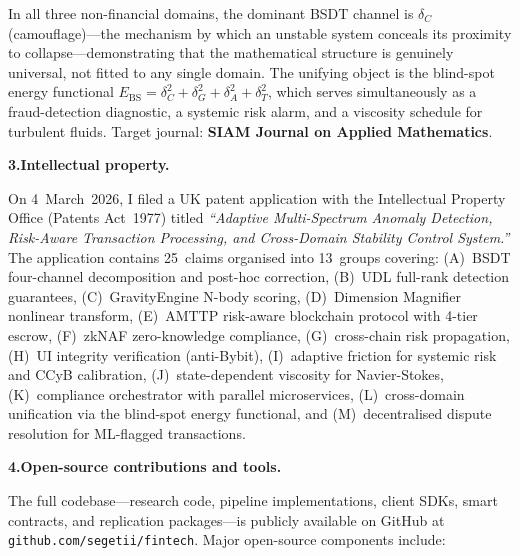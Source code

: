 \documentclass[12pt,a4paper]{article}
\begin{document}
\noindent
In all three non-financial domains, the dominant BSDT channel is
$\delta_C$ (camouflage)---the mechanism by which an unstable system
conceals its proximity to collapse---demonstrating that the mathematical
structure is genuinely universal, not fitted to any single domain.  The
unifying object is the blind-spot energy functional
$E_{\mathrm{BS}} = \delta_C^2 + \delta_G^2 + \delta_A^2 + \delta_T^2$,
which serves simultaneously as a fraud-detection diagnostic, a systemic
risk alarm, and a viscosity schedule for turbulent fluids.
Target journal: \textbf{SIAM Journal on Applied Mathematics}.


\textbf{3.\enspace Intellectual property.}

On 4~March~2026, I filed a UK patent application with the Intellectual
Property Office (Patents Act~1977) titled \textit{``Adaptive
Multi-Spectrum Anomaly Detection, Risk-Aware Transaction Processing,
and Cross-Domain Stability Control System.''} The application contains
25~claims organised into 13~groups covering: (A)~BSDT four-channel
decomposition and post-hoc correction, (B)~UDL full-rank detection
guarantees, (C)~GravityEngine N-body scoring, (D)~Dimension Magnifier
nonlinear transform, (E)~AMTTP risk-aware blockchain protocol with
4-tier escrow, (F)~zkNAF zero-knowledge compliance, (G)~cross-chain risk
propagation, (H)~UI integrity verification (anti-Bybit),
(I)~adaptive friction for systemic risk and CCyB calibration,
(J)~state-dependent viscosity for Navier-Stokes, (K)~compliance
orchestrator with parallel microservices, (L)~cross-domain unification
via the blind-spot energy functional, and (M)~decentralised dispute
resolution for ML-flagged transactions.


\textbf{4.\enspace Open-source contributions and tools.}

The full codebase---research code, pipeline implementations, client SDKs,
smart contracts, and replication packages---is publicly available on
GitHub at \texttt{github.com/segetii/fintech}.  Major open-source
components include:
\end{document}
